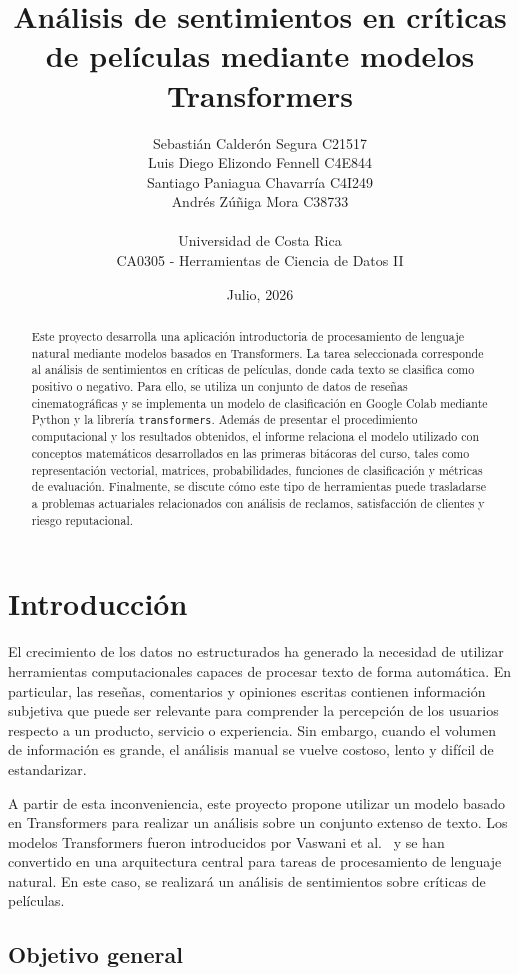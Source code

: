 \documentclass[11pt,letterpaper]{article}
\title{\textbf{Análisis de sentimientos en críticas de películas mediante modelos Transformers}}
\author{
	Sebastián Calderón Segura C21517\\
	Luis Diego Elizondo Fennell C4E844 \\
	Santiago Paniagua Chavarría C4I249\\
	Andrés Zúñiga Mora C38733\\
	\\
	Universidad de Costa Rica \\
	CA0305 - Herramientas de Ciencia de Datos II
}
\date{Julio, 2026}
\begin{document}
	
	\maketitle
	
	\begin{abstract}
		Este proyecto desarrolla una aplicación introductoria de procesamiento de lenguaje natural mediante modelos basados en Transformers. La tarea seleccionada corresponde al análisis de sentimientos en críticas de películas, donde cada texto se clasifica como positivo o negativo. Para ello, se utiliza un conjunto de datos de reseñas cinematográficas y se implementa un modelo de clasificación en Google Colab mediante Python y la librería \texttt{transformers}. Además de presentar el procedimiento computacional y los resultados obtenidos, el informe relaciona el modelo utilizado con conceptos matemáticos desarrollados en las primeras bitácoras del curso, tales como representación vectorial, matrices, probabilidades, funciones de clasificación y métricas de evaluación. Finalmente, se discute cómo este tipo de herramientas puede trasladarse a problemas actuariales relacionados con análisis de reclamos, satisfacción de clientes y riesgo reputacional.
	\end{abstract}
	
	\section{Introducción}
	
	El crecimiento de los datos no estructurados ha generado la necesidad de utilizar herramientas computacionales capaces de procesar texto de forma automática. En particular, las reseñas, comentarios y opiniones escritas contienen información subjetiva que puede ser relevante para comprender la percepción de los usuarios respecto a un producto, servicio o experiencia. Sin embargo, cuando el volumen de información es grande, el análisis manual se vuelve costoso, lento y difícil de estandarizar.
	
	A partir de esta inconveniencia, este proyecto propone utilizar un modelo basado en Transformers para realizar un análisis sobre un conjunto extenso de texto. Los modelos Transformers fueron introducidos por Vaswani et al.~\cite{vaswani2017} y se han convertido en una arquitectura central para tareas de procesamiento de lenguaje natural. En este caso, se realizará un análisis de sentimientos sobre críticas de películas.
	
	\subsection{Objetivo general}
	
\end{document}
